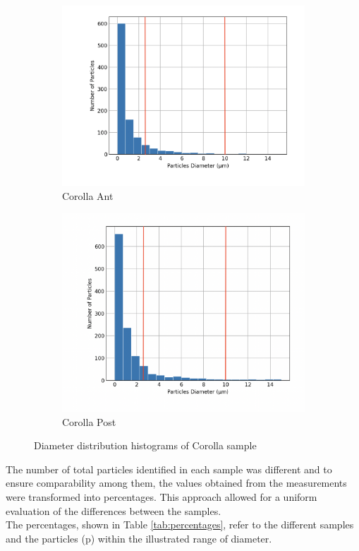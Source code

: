 \begin{figure}[H]
\centering
\begin{subfigure}{.5\textwidth}
  \centering
  \includegraphics[width=1\linewidth]{images/corolla_ant_dis.png}
  \caption{Corolla Ant}
  \label{fig:corollaant}
\end{subfigure}%
\begin{subfigure}{.5\textwidth}
  \centering
  \includegraphics[width=0.9\linewidth]{images/corolla_post_dis.png}
  \caption{Corolla Post}
  \label{fig:corollapost}
\end{subfigure}
\caption{Diameter distribution histograms of Corolla sample}
\label{fig:5}
\end{figure}


The number of total particles identified in each sample was different and to ensure comparability among them, the values obtained from the measurements were transformed into percentages. This approach allowed for a uniform evaluation of the differences between the samples. \\
The percentages, shown in Table \ref{tab:percentages}, refer to the different samples and the particles (p) within the illustrated range of diameter. 

